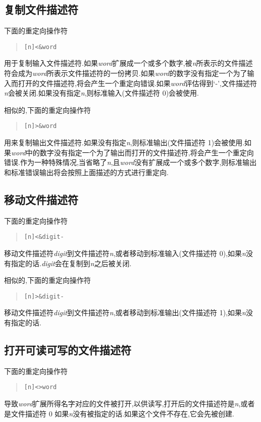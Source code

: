 \documentclass[draft,openany]{book}
\begin{document}
\begin{CJK}{UTF8}{gbsn}
    \subsection{复制文件描述符}
    下面的重定向操作符
    \begin{quote}
        \verb+[n]<&word+
    \end{quote}
    用于复制输入文件描述符.如果\emph{word}扩展成一个或多个数字,被\emph{n}所表示的文件描述符会成为\emph{word}所表示文件描述符的一份拷贝.如果\emph{word}的数字没有指定一个为了输入而打开的文件描述符,将会产生一个重定向错误.如果\emph{word}评估得到`-',文件描述符\emph{n}会被关闭.如果没有指定\emph{n},则标准输入(文件描述符 0)会被使用.\par
    相似的,下面的重定向操作符
    \begin{quote}
        \verb+[n]>&word+
    \end{quote}
    用来复制输出文件描述符.如果没有指定\emph{n},则标准输出(文件描述符 1)会被使用.如果\emph{word}中的数字没有指定一个为了输出而打开的文件描述符,将会产生一个重定向错误.作为一种特殊情况,当省略了\emph{n},且\emph{word}没有扩展成一个或多个数字,则标准输出和标准错误输出将会按照上面描述的方式进行重定向.
    
    \subsection{移动文件描述符}
    下面的重定向操作符
    \begin{quote}
        \verb+[n]<&digit-+
    \end{quote}
    移动文件描述符\emph{digit}到文件描述符\emph{n},或者移动到标准输入(文件描述符 0),如果\emph{n}没有指定的话.\emph{digit}会在复制到\emph{n}之后被关闭.\par
    相似的,下面的重定向操作符
    \begin{quote}
        \verb+[n]>&digit-+
    \end{quote}
    移动文件描述符\emph{digit}到文件描述符\emph{n},或者移动到标准输出(文件描述符 1),如果\emph{n}没有指定的话.

    \subsection{打开可读可写的文件描述符}
    下面的重定向操作符
    \begin{quote}
        \verb+[n]<>word+
    \end{quote}
    导致\emph{word}扩展所得名字对应的文件被打开,以供读写,打开后的文件描述符是\emph{n},或者是文件描述符 0 如果\emph{n}没有被指定的话.如果这个文件不存在,它会先被创建.


\end{CJK}
\end{document}
